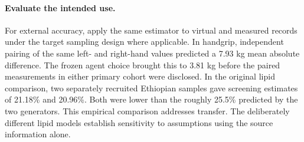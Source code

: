 \documentclass[sigconf,anonymous,nonacm]{acmart}
\begin{document}
\paragraph{Evaluate the intended use.}
For external accuracy, apply the same estimator to virtual and measured records under the target sampling design where applicable. In handgrip, independent pairing of the same left- and right-hand values predicted a 7.93 kg mean absolute difference. The frozen agent choice brought this to 3.81 kg before the paired measurements in either primary cohort were disclosed. In the original lipid comparison, two separately recruited Ethiopian samples gave screening estimates of 21.18\% and 20.96\%. Both were lower than the roughly 25.5\% predicted by the two generators. This empirical comparison addresses transfer. The deliberately different lipid models establish sensitivity to assumptions using the source information alone.
\end{document}
